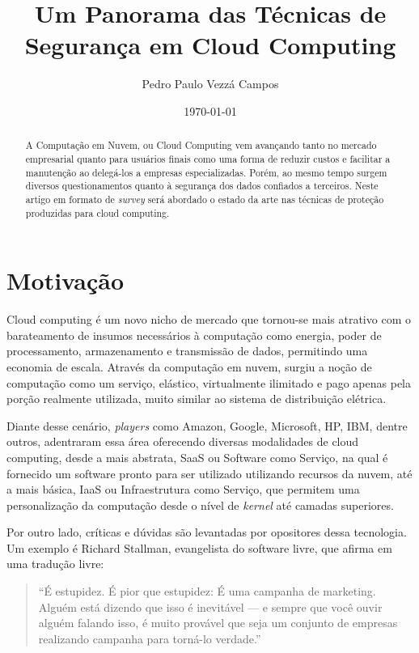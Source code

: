 \documentclass[brazil,12pt]{article}
\begin{document}
\title{Um Panorama das Técnicas de Segurança em Cloud Computing}
\author{Pedro Paulo Vezzá Campos}
\date{\today}
\maketitle

\begin{abstract}
A Computação em Nuvem, ou Cloud Computing vem avançando tanto no mercado
empresarial quanto para usuários finais como uma forma de
reduzir custos e facilitar a manutenção ao delegá-los a empresas especializadas.
Porém, ao mesmo tempo surgem diversos questionamentos quanto à segurança dos
dados confiados a terceiros. Neste artigo em formato de \emph{survey} será
abordado o estado da arte nas técnicas de proteção produzidas para cloud computing.
\end{abstract}

\section{Motivação}
Cloud computing é um novo nicho de mercado que tornou-se mais atrativo com o
barateamento de insumos necessários à computação como energia, poder de
processamento, armazenamento e transmissão de dados, permitindo uma economia de
escala. \cite{above-clouds} Através da computação em nuvem, surgiu a noção de
computação como um serviço, elástico, virtualmente ilimitado e pago apenas pela
porção realmente utilizada, muito similar ao sistema de distribuição elétrica.

Diante desse cenário, \emph{players} como Amazon, Google,
Microsoft, HP, IBM, dentre outros, adentraram essa área oferecendo diversas
modalidades de cloud computing, desde a mais abstrata, SaaS ou Software como
Serviço, na qual é fornecido um software pronto para ser utilizado utilizando
recursos da nuvem, até a mais básica, IaaS ou Infraestrutura como Serviço, que
permitem uma personalização da computação desde o nível de \emph{kernel} até
camadas superiores.

Por outro lado, críticas e dúvidas são levantadas por opositores dessa
tecnologia. Um exemplo é Richard Stallman, evangelista do software livre, que
afirma em uma tradução livre:

\begin{quote}
``É estupidez. É pior que estupidez: É uma campanha de marketing. Alguém está
dizendo que isso é inevitável — e sempre que você ouvir alguém falando isso, é
muito provável que seja um conjunto de empresas realizando campanha para
torná-lo verdade.'' \cite{stallman-cloud}
\end{quote}
\end{document}
